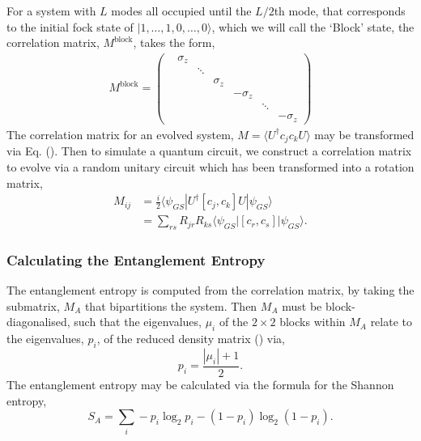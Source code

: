 For a system with $L$ modes all occupied until the $L/2 $th mode, that corresponds to the initial fock state of $|1, \dots, 1, 0, \dots, 0 \rangle$, which we will call the `Block' state,  the correlation matrix, $M^{\text{block}}$, takes the form, 
\begin{align}\label{block}
        M^{\text{block}} = 
        \begin{pmatrix}
            & \sigma_z &  &\\
             && \ddots &\\
           & && \sigma_z&\\
           & &&& -\sigma_z & \\
           & &&&& \ddots & \\
           &&&&&&-\sigma_z
        \end{pmatrix}
    \end{align}
The correlation matrix for an evolved system, $M = \langle U^{\dagger} c_j c_k U\rangle$ may be transformed via Eq. (). Then to simulate a quantum circuit, we construct a correlation matrix to evolve via a random unitary circuit which has been transformed into a rotation matrix, 
\begin{align}
    M_{ij} &=  \frac{i}{2}\langle\psi_{GS} |U^{\dagger} [c_j, c_k] U|\psi_{GS}\rangle \\
    &= \sum_{r s} R_{jr}R_{ks}\langle \psi_{GS} | [c_r, c_s]| \psi_{GS} \rangle.
\end{align}

\subsubsection{Calculating the Entanglement Entropy}

The entanglement entropy is computed from the correlation matrix, by taking the submatrix, $M_A$ that bipartitions the system. Then $M_A$ must be block-diagonalised, such that the eigenvalues, $\mu_i$ of the $2\times 2$ blocks within $M_A$ relate to the eigenvalues, $p_i$,  of the reduced density matrix () via, 
\begin{equation}
    p_i = \frac{|\mu_i| + 1}{2}.
\end{equation}
The entanglement entropy may be calculated via the formula for the Shannon entropy, 
\begin{equation}
    S_A = \sum_{i} -p_i \log_2p_i - (1-p_i) \log_2(1-p_i).
\end{equation}


